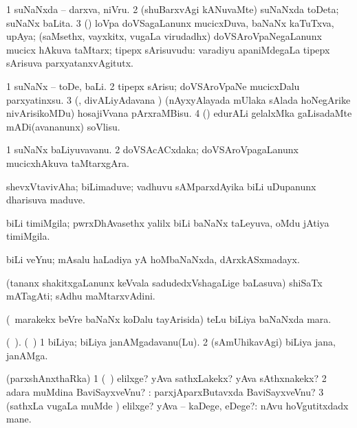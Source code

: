 \bentry
{} 
\gl{\nA}
\expl{}
\bmng
\bnum
\num{1} suNaNxda -- darxva, niVru. 
\num{2} (shuBarxvAgi kANuvaMte) suNaNxda toDeta; suNaNx baLita. 
\num{3} (\rUpa) loVpa doVSagaLanunx mucicxDuva, baNaNx kaTuTxva, upAya; (saMsethx, vayxkitx, \mo vugaLa virudadhx) doVSAroVpaNegaLanunx mucicx hAkuva taMtarx; tipepx sArisuvudu:  varadiyu apaniMdegaLa tipepx sArisuva parxyatanxvAgitutx. 
\enum
\emng
\eentry

\bentry
{} 
\gl{\sakirx}
\bmng
\bnum
\num{1} suNaNx -- toDe, baLi. 
\num{2} tipepx sArisu; doVSAroVpaNe mucicxDalu parxyatinxsu. 
\num{3} (\kaparx, divALiyAdavana \vi) (nAyxyAlayada mUlaka sAlada hoNegArike nivArisikoMDu) hosajiVvana pArxraMBisu. 
\num{4} (\ame) edurALi gelalxMka gaLisadaMte mADi(avananunx) soVlisu. 
\enum
\emng
\eentry

\bentry
{}
\gl{\nA}
\bmng
\bnum
\num{1} suNaNx baLiyuvavanu. 
\num{2} doVSAcACxdaka; doVSAroVpagaLanunx mucicxhAkuva taMtarxgAra. 
\enum
\emng
\eentry

\bentry
{}
\gl{\nA}
\bmng
shevxVtavivAha; biLimaduve; vadhuvu sAMparxdAyika biLi uDupanunx dharisuva maduve. 
\emng
\eentry

\bentry
{} 
\gl{\nA}
\expl{}
\bmng
biLi timiMgila; pwrxDhAvasethx yalilx biLi baNaNx taLeyuva, oMdu jAtiya timiMgila. 
\emng
\eentry

\bentry
{}
\gl{\nA}
\bmng
biLi veYnu; mAsalu haLadiya yA hoMbaNaNxda, dArxkASxmadayx. 
\emng
\eentry

\bentry
{}
\gl{\nA}
\bmng
(tananx shakitxgaLanunx keVvala sadudedxVshagaLige baLasuva) shiSaTx mATagAti; sAdhu maMtarxvAdini. 
\emng
\eentry

\bentry
{}
\gl{\nA}
\bmng
(\kanmu\ marakekx beVre baNaNx koDalu tayArisida) teLu biLiya baNaNxda mara. 
\emng
\eentry

\bentry
{}
\gl{\nA}(\bava\ ). 
\bmng
 (\sA\ \hiV) 
\bnum
\num{1} biLiya; biLiya janAMgadavanu(Lu). 
\num{2} (sAmUhikavAgi) biLiya jana, janAMga. 
\enum
\emng
\eentry

\bentry
{} 
\gl{\kirxvi}
\bmng
(parxshAnxthaRka) 
\bnum
\num{1} (\pArxparx\ \rUpa) elilxge? yAva sathxLakekx? yAva sAthxnakekx? 
\num{2} adara muMdina BaviSayxveVnu? :  parxjAparxButavxda BaviSayxveVnu? 
\num{3} (sathxLa \mo vugaLa muMde \parx) elilxge? yAva -- kaDege, eDege?:  nAvu hoVgutitxdadx mane. 
\enum
\emng
\eentry

